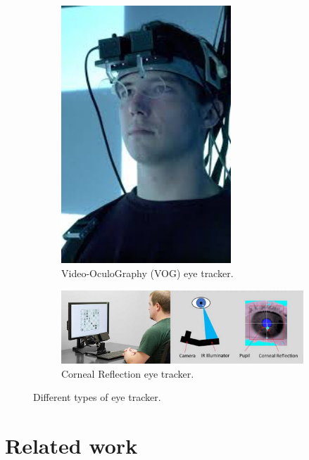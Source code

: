 \documentclass[12pt]{report}
\begin{document}
\begin{figure}[ht]
    \vspace{0.5em}
    
    \begin{subfigure}[b]{0.45\textwidth}
        \centering
        \includegraphics[width=0.7\textwidth,height=0.6\textwidth]{Images/Theory/vog.jpeg}
        \caption{Video-OculoGraphy (VOG) eye tracker.}
        \label{fig:vog}
    \end{subfigure}
    \hfill
    \begin{subfigure}[b]{0.45\textwidth}
        \centering
        \includegraphics[width=1\textwidth,height=0.6\textwidth]{Images/Theory/corneal.jpg}
        \caption{Corneal Reflection eye tracker.}
        \label{fig:corneal}
    \end{subfigure}

    \caption{Different types of eye tracker.}
    \label{fig:four_grid}
\end{figure}

\newpage
\chapter{Related work}
\end{document}
